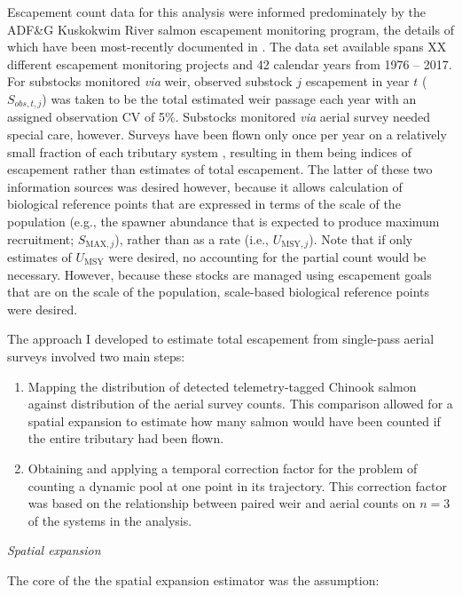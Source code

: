 \documentclass[12pt,]{book}
\theoremstyle{definition}
\theoremstyle{definition}
\theoremstyle{definition}
\theoremstyle{remark}
\begin{document}
\noindent
Escapement count data for this analysis were informed predominately by
the ADF\&G Kuskokwim River salmon escapement monitoring program, the
details of which have been most-recently documented in
\citep{head-liller-2017}. The data set available spans XX different
escapement monitoring projects and 42 calendar years from 1976 -- 2017.
For substocks monitored \emph{via} weir, observed substock \(j\)
escapement in year \(t\) (\(S_{obs,t,j}\)) was taken to be the total
estimated weir passage each year with an assigned observation CV of 5\%.
Substocks monitored \emph{via} aerial survey needed special care,
however. Surveys have been flown only once per year on a relatively
small fraction of each tributary system \citep{head-liller-2017},
resulting in them being indices of escapement rather than estimates of
total escapement. The latter of these two information sources was
desired however, because it allows calculation of biological reference
points that are expressed in terms of the scale of the population (e.g.,
the spawner abundance that is expected to produce maximum recruitment;
\(S_{\text{MAX},j}\)), rather than as a rate (i.e.,
\(U_{\text{MSY},j}\)). Note that if only estimates of \(U_{\text{MSY}}\)
were desired, no accounting for the partial count would be necessary.
However, because these stocks are managed using escapement goals that
are on the scale of the population, scale-based biological reference
points were desired.

The approach I developed to estimate total escapement from single-pass
aerial surveys involved two main steps:

\begin{enumerate}
\def\labelenumi{(\arabic{enumi})}
\item
  Mapping the distribution of detected telemetry-tagged Chinook salmon
  against distribution of the aerial survey counts. This comparison
  allowed for a spatial expansion to estimate how many salmon would have
  been counted if the entire tributary had been flown.
\item
  Obtaining and applying a temporal correction factor for the problem of
  counting a dynamic pool at one point in its trajectory. This
  correction factor was based on the relationship between paired weir
  and aerial counts on \(n=3\) of the systems in the analysis.
\end{enumerate}

\noindent
\emph{Spatial expansion}

\noindent
The core of the the spatial expansion estimator was the assumption:
\end{document}
